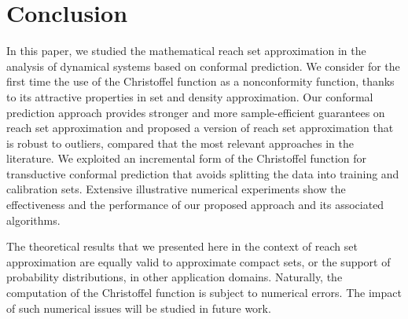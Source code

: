 \documentclass[pmlr]{jmlr}%
\begin{document}
\section{Conclusion}
%
In this paper, we studied the mathematical reach set approximation in the analysis of dynamical systems based on conformal prediction. We consider for the first time the use of the Christoffel function as a nonconformity function, thanks to its attractive properties in set and density approximation. Our conformal prediction approach provides stronger and more sample-efficient guarantees on reach set approximation and proposed a version of reach set approximation that is robust to outliers,  compared that the most relevant approaches in the literature. We exploited an incremental form of the Christoffel function for transductive conformal prediction that avoids splitting the data into training and calibration sets. 
Extensive illustrative numerical experiments show the effectiveness and the performance of our proposed approach and its associated algorithms. 
%

The theoretical results that we presented here in the context of reach set approximation are equally valid to approximate compact sets, or the support of probability distributions, in other application domains. Naturally, the computation of the Christoffel function is subject to numerical errors. The impact of such numerical issues will be studied in future work.









\end{document}
